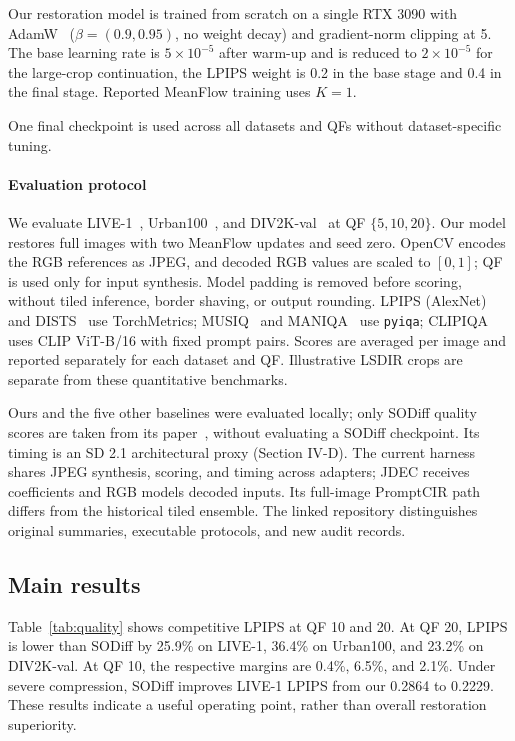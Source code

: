 \documentclass[conference,letterpaper]{IEEEtran}
\begin{document}
Our restoration model is trained from scratch on a single RTX 3090 with AdamW~\cite{loshchilov2019adamw} ($\beta=(0.9,0.95)$, no weight decay) and gradient-norm clipping at 5.  The base learning rate is $5\times10^{-5}$ after warm-up and is reduced to $2\times10^{-5}$ for the large-crop continuation, the LPIPS weight is 0.2 in the base stage and 0.4 in the final stage.  Reported MeanFlow training uses $K=1$.

One final checkpoint is used across all datasets and QFs without dataset-specific tuning.

\paragraph{Evaluation protocol}
We evaluate LIVE-1~\cite{sheikh2005live1}, Urban100~\cite{huang2015urban100}, and DIV2K-val~\cite{agustsson2017div2k} at QF $\{5,10,20\}$. Our model restores full images with two MeanFlow updates and seed zero. OpenCV encodes the RGB references as JPEG, and decoded RGB values are scaled to $[0,1]$; QF is used only for input synthesis. Model padding is removed before scoring, without tiled inference, border shaving, or output rounding. LPIPS (AlexNet)~\cite{zhang2018lpips} and DISTS~\cite{ding2020dists} use TorchMetrics; MUSIQ~\cite{ke2021musiq} and MANIQA~\cite{yang2022maniqa} use \texttt{pyiqa}; CLIPIQA~\cite{wang2023clipiqa} uses CLIP ViT-B/16 with fixed prompt pairs. Scores are averaged per image and reported separately for each dataset and QF. Illustrative LSDIR crops are separate from these quantitative benchmarks.

Ours and the five other baselines were evaluated locally; only SODiff quality scores are taken from its paper~\cite{yang2025sodiff}, without evaluating a SODiff checkpoint. Its timing is an SD 2.1 architectural proxy (Section IV-D). The current harness shares JPEG synthesis, scoring, and timing across adapters; JDEC receives coefficients and RGB models decoded inputs. Its full-image PromptCIR path differs from the historical tiled ensemble. The linked repository distinguishes original summaries, executable protocols, and new audit records.

\subsection{Main results}

Table~\ref{tab:quality} shows competitive LPIPS at QF 10 and 20. At QF 20, LPIPS is lower than SODiff by 25.9\% on LIVE-1, 36.4\% on Urban100, and 23.2\% on DIV2K-val. At QF 10, the respective margins are 0.4\%, 6.5\%, and 2.1\%. Under severe compression, SODiff improves LIVE-1 LPIPS from our 0.2864 to 0.2229. These results indicate a useful operating point, rather than overall restoration superiority.
\end{document}
